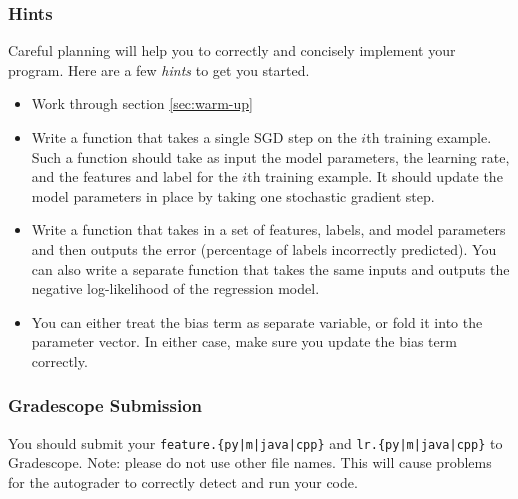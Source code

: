 \documentclass[11pt]{exam}
\numberwithin{equation}{section} %
\numberwithin{figure}{section} %
\numberwithin{table}{section} %
\begin{document}
\subsubsection{Hints}
Careful planning will help you to correctly and concisely implement your program. Here are a few \emph{hints} to get you started.
\begin{itemize}
    \item Work through section \ref{sec:warm-up}
    \item Write a function that takes a single SGD step on the $i$th training example. Such a function should take as input the model parameters, the learning rate, and the features and label for the $i$th training example. It should update the model parameters in place by taking one stochastic gradient step.
    \item Write a function that takes in a set of features, labels, and model parameters and then outputs the error (percentage of labels incorrectly predicted). You can also write a separate function that takes the same inputs and outputs the negative log-likelihood of the regression model.
    \item You can either treat the bias term as separate variable, or fold it into the parameter vector. In either case, make sure you update the bias term correctly.  
\end{itemize}

\subsubsection{Gradescope Submission}

You should submit your \texttt{feature.\{py|m|java|cpp\}} and %
\texttt{lr.\{py|m|java|cpp\}} to Gradescope.
Note: please do not use other file names. This will cause problems for the autograder to correctly detect and run your code.
\end{document}
